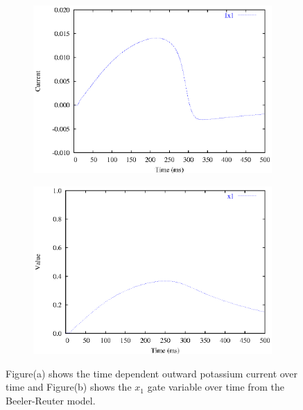 \begin{figure}[hbtp] 
  \centering
  \begin{subfigure}[b]{0.45\linewidth}
    \centering
    \includegraphics[width=\textwidth]{cardiac_electrophysiology/epsfiles/BR_Ix1.eps}
    \caption{}
  \end{subfigure}
  \hfill
  \begin{subfigure}[b]{0.45\linewidth}
    \centering
    \includegraphics[width=\textwidth]{cardiac_electrophysiology/epsfiles/BR_x1.eps}
    \caption{}
  \end{subfigure}
  \caption[Beeler-Reuter time dependent potassium current]{Figure(a) shows the
    time dependent outward potassium current over time and Figure(b) shows the
    $x_1$ gate variable over time from the Beeler-Reuter model.}
  \label{fig:BR_Ix1_traces}
\end{figure}
%
